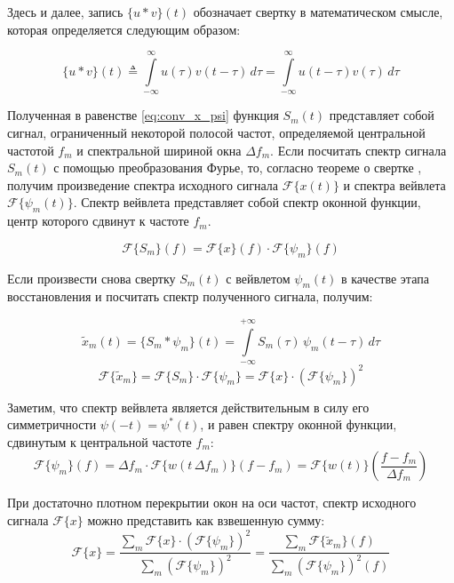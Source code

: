 Здесь и далее, запись $\{u*v\}(t)$ обозначает свертку в математическом смысле, которая определяется следующим образом:

\begin{equation}
  \{u*v\}(t)\triangleq \int \limits_{-\infty }^{\infty }u(\tau )v(t-\tau )\,d\tau = \int \limits_{-\infty }^{\infty }u(t-\tau )v(\tau )\,d\tau
\end{equation}

Полученная в равенстве \ref{eq:conv_x_psi} функция $S_m(t)$ представляет собой сигнал, ограниченный некоторой полосой частот, 
определяемой центральной частотой $f_m$ и спектральной шириной окна $\Delta f_m$.
Если посчитать спектр сигнала $S_m(t)$ с помощью преобразования Фурье, то, согласно теореме о свертке \cite{conv_theorem}, 
получим произведение спектра исходного сигнала $\mathcal{F}\{x(t)\}$ и спектра вейвлета $\mathcal{F}\{\psi_m(t)\}$.
Спектр вейвлета представляет собой спектр оконной функции, центр которого сдвинут к частоте $f_m$.

\begin{equation}
  \mathcal{F}\{S_m\}(f) = \mathcal{F}\{x\}(f) \cdot \mathcal{F}\{\psi_m\}(f)
\end{equation}

Если произвести снова свертку $S_m(t)$ с вейвлетом $\psi_m(t)$ в качестве этапа восстановления и посчитать спектр полученного сигнала, получим:

\begin{equation}
  \tilde{x}_m(t) = \{S_m * \psi_m\}(t) = \int \limits _{-\infty}^{+\infty} S_m(\tau)\,\psi_m(t - \tau)\,d\tau
\end{equation}
\begin{equation}
  \mathcal{F}\{\tilde{x}_m\} = \mathcal{F}\{S_m\} \cdot \mathcal{F}\{\psi_m\} = \mathcal{F}\{x\} \cdot (\mathcal{F}\{\psi_m\})^2
\end{equation}

Заметим, что спектр вейвлета является действительным в силу его симметричности $\psi(-t) = \psi^{*}(t)$, и равен спектру оконной функции, сдвинутым к центральной частоте $f_m$:
\begin{equation}
  \mathcal{F}\{\psi_m\}(f) = \Delta f_m \cdot \mathcal{F}\{w(t\,\Delta f_m)\}(f - f_m) = \mathcal{F}\{w(t)\}\left(\frac{f - f_m}{\Delta f_m}\right)
\end{equation}

При достаточно плотном перекрытии окон на оси частот, спектр исходного сигнала $\mathcal{F}\{x\}$ можно представить как взвешенную сумму:
\begin{equation}
  \mathcal{F}\{x\} = \frac{
    \sum \limits_m \mathcal{F}\{x\} \cdot (\mathcal{F}\{\psi_m\})^2
  }{
    \sum \limits_m (\mathcal{F}\{\psi_m\})^2
  } = 
  \frac{
    \sum \limits_m \mathcal{F}\{\tilde{x}_m\}(f)
  }{
    \sum \limits_m (\mathcal{F}\{\psi_m\})^2(f)
  }
  \label{eq:back_weighted_sum}
\end{equation}

